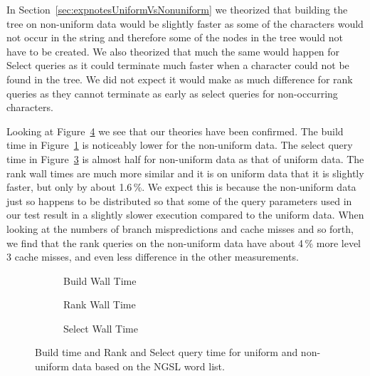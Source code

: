 In Section~\ref{sec:expnotesUniformVsNonuniform} we theorized that building the tree on non-uniform data would be slightly faster as some of the characters would not occur in the string and therefore some of the nodes in the tree would not have to be created.
We also theorized that much the same would happen for Select queries as it could terminate much faster when a character could not be found in the tree.
We did not expect it would make as much difference for rank queries as they cannot terminate as early as select queries for non-occurring characters.

Looking at Figure~\ref{fig:UniformVsNonUniform} we see that our theories have been confirmed. 
The build time in Figure~\ref{fig:UniformVsNonUniform_Build_WallTime} is noticeably lower for the non-uniform data.
The select query time in Figure~\ref{fig:UniformVsNonUniform_Select_WallTime} is almost half for non-uniform data as that of uniform data.
The rank wall times are much more similar and it is on uniform data that it is slightly faster, but only by about 1.6\,\%.
We expect this is because the non-uniform data just so happens to be distributed so that some of the query parameters used in our test result in a slightly slower execution compared to the uniform data.
When looking at the numbers of branch mispredictions and cache misses and so forth, we find that the rank queries on the non-uniform data have about 4\,\% more level 3 cache misses, and even less difference in the other measurements.


\begin{figure}\tiny
	\begin{subfigure}{0.31\textwidth}
		
		\caption{Build Wall Time}
		\label{fig:UniformVsNonUniform_Build_WallTime}
	\end{subfigure}
	\hfill
	\begin{subfigure}{0.31\textwidth}
		
		\caption{Rank Wall Time}
		\label{fig:UniformVsNonUniform_Rank_WallTime}
	\end{subfigure}	
	\hfill
	\begin{subfigure}{0.31\textwidth}
		
		\caption{Select Wall Time}
		\label{fig:UniformVsNonUniform_Select_WallTime}
	\end{subfigure}
\caption{Build time and Rank and Select query time for uniform and non-uniform data based on the NGSL word list.}
\label{fig:UniformVsNonUniform}
\end{figure}

